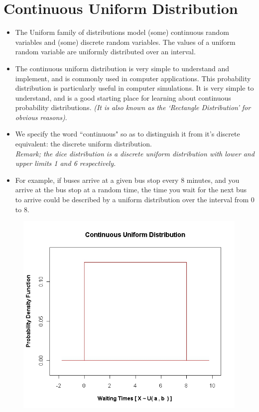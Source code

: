 \documentclass[a4paper,12pt]{article}
\begin{document}
\section*{Continuous Uniform Distribution}
\begin{itemize}
	\item  
	The Uniform family of distributions model (some) continuous random variables and (some) discrete random variables. The values of a uniform random variable are uniformly distributed over an interval. 

\item The continuous uniform distribution is very simple to understand and implement, and is commonly used in computer applications. This probability distribution is particularly useful in computer simulations. It is very simple to understand, and is a good starting place for learning about continuous probability distributions.
\textit{(It is also known as the `Rectangle Distribution' for obvious reasons)}.
\item We specify the word ``continuous" so as to distinguish it from it's discrete equivalent: the discrete uniform distribution.\\ \textit{Remark; the dice distribution is a discrete uniform distribution with lower and upper limits 1 and 6 respectively.}
	\item 
For example, if buses arrive at a given bus stop every 8 minutes, and you arrive at the bus stop at a random time, the time you wait for the 
next bus to arrive could be described by a uniform distribution over the interval from 0 to 8.
\end{itemize}


\begin{figure}[h!]
	\centering
	\includegraphics[width=0.5\linewidth]{images/6AUniform}
	\caption{}
	\label{fig:6AUniform}
\end{figure}
\end{document}
